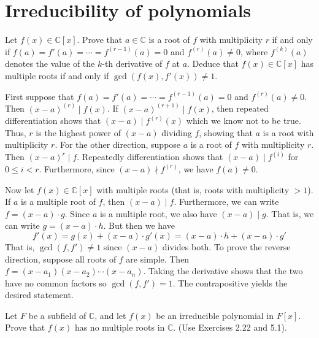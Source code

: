 \documentclass[../../master.tex]{subfiles}
\begin{document}
\section{Irreducibility of polynomials}

\begin{problem}
    Let $f(x) \in \mathbb{C}[x]$.
    Prove that $a \in \mathbb{C}$ is a root of $f$ with multiplicity $r$ if and only if $f(a) = f'(a) = \cdots = f^{(r-1)}(a) = 0$ and $f^{(r)}(a) \neq 0$, where $f^{(k)}(a)$ denotes the value of the $k$-th derivative of $f$ at $a$.
    Deduce that $f(x) \in \mathbb{C}[x]$ has multiple roots if and only if $\gcd(f(x), f'(x)) \neq 1.$
\end{problem}

\begin{solution}
    First suppose that $f(a) = f'(a) = \cdots = f^{(r-1)}(a) = 0$ and $f^{(r)}(a) \neq 0$.
    Then $(x-a)^{(r)} \mid f(x)$.
    If $(x-a)^{(r+1)} \mid f(x)$, then repeated differentiation shows that $(x-a) \mid f^{(r)}(x)$ which we know not to be true.
    Thus, $r$ is the highest power of $(x-a)$ dividing $f$, showing that $a$ is a root with multiplicity $r$. 
    For the other direction, suppose $a$ is a root of $f$ with multiplicity $r$. 
    Then $(x - a)^{r} \mid f$. 
    Repeatedly differentiation shows that $(x - a) \mid f^{(i)}$ for $0 \leq i < r$.
    Furthermore, since $(x - a) \nmid f^{(r)}$, we have $f(a) \neq 0$.

    Now let $f(x) \in \mathbb{C}[x]$ with multiple roots (that is, roots with multiplicity $> 1$).
    If $a$ is a multiple root of $f$, then $(x - a) \mid f$. 
    Furthermore, we can write $f = (x - a) \cdot g$. 
    Since $a$ is a multiple root, we also have $(x - a) \mid g$.
    That is, we can write $g = (x - a) \cdot h$.
    But then we have
    \[
        f'(x) = g(x) + (x - a) \cdot g'(x) = (x - a) \cdot h + (x - a) \cdot g'
    \]
    That is, $\gcd(f, f') \neq 1$ since $(x - a)$ divides both.
    To prove the reverse direction, suppose all roots of $f$ are simple.
    Then $f = (x - a_1) (x - a_2) \cdots (x - a_n)$.
    Taking the derivative shows that the two have no common factors so $\gcd(f, f') = 1$.
    The contrapositive yields the desired statement.
\end{solution}

\begin{problem}
    Let $F$ be a subfield of $\mathbb{C}$, and let $f(x)$ be an irreducible polynomial in $F[x]$.
    Prove that $f(x)$ has no multiple roots in $\mathbb{C}$. (Use Exercises 2.22 and 5.1).
\end{problem}
\end{document}

